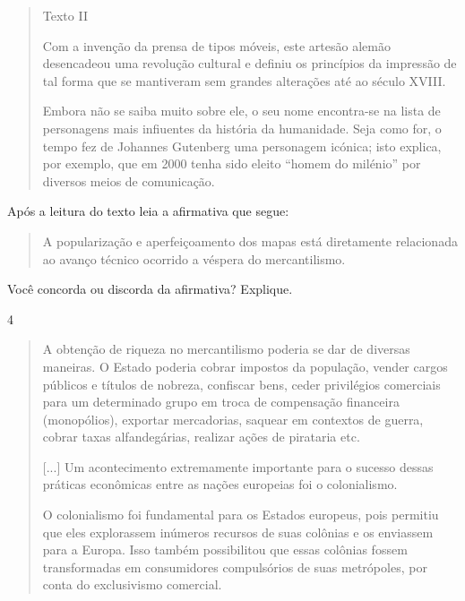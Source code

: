 \begin{quote}
Texto II

Com a invenção da prensa de tipos móveis, este artesão alemão
desencadeou uma revolução cultural e definiu os princípios da impressão
de tal forma que se mantiveram sem grandes alterações até ao século
XVIII.

Embora não se saiba muito sobre ele, o seu nome encontra-se na
lista de personagens mais infiuentes da história da humanidade. Seja
como for, o tempo fez de Johannes Gutenberg uma personagem icónica; isto
explica, por exemplo, que em 2000 tenha sido eleito ``homem do milénio''
por diversos meios de comunicação.

\end{quote}

Após a leitura do texto leia a afirmativa que segue:

\begin{quote}
A popularização e aperfeiçoamento dos mapas está diretamente relacionada
ao avanço técnico ocorrido a véspera do mercantilismo.
\end{quote}

Você concorda ou discorda da afirmativa? Explique.



\num{4}

\begin{quote}
A obtenção de riqueza no mercantilismo poderia se dar de diversas
maneiras. O Estado poderia cobrar impostos da população, vender cargos
públicos e títulos de nobreza, confiscar bens, ceder privilégios
comerciais para um determinado grupo em troca de compensação financeira
(monopólios), exportar mercadorias, saquear em contextos de guerra,
cobrar taxas alfandegárias, realizar ações de pirataria
etc.

{[}...{]} Um acontecimento extremamente importante para o sucesso
dessas práticas econômicas entre as nações europeias foi o
colonialismo.

O colonialismo foi fundamental para os Estados europeus, pois
permitiu que eles explorassem inúmeros recursos de suas colônias e os
enviassem para a Europa. Isso também possibilitou que essas colônias
fossem transformadas em consumidores compulsórios de suas metrópoles,
por conta do exclusivismo comercial.

\end{quote}

